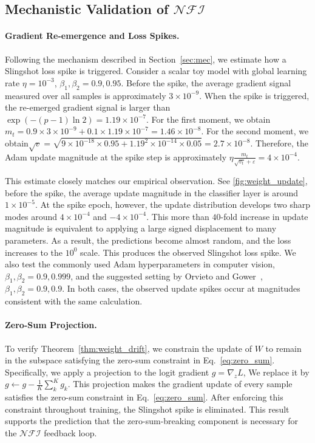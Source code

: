 \documentclass{article}
\theoremstyle{plain}
\theoremstyle{definition}
\theoremstyle{remark}
\begin{document}
\subsection{Mechanistic Validation of $\mathcal{NFI}$}



\paragraph{Gradient Re-emergence and Loss Spikes.}
Following the mechanism described in Section~\ref{sec:mec}, we estimate how a Slingshot loss spike is triggered. 
Consider a scalar toy model with global learning rate $\eta = 10^{-3}$, $\beta_1, \beta_2 = 0.9, 0.95$. 
Before the spike, the average gradient signal measured over all samples is approximately $3 \times 10^{-9}$. 
When the spike is triggered, the re-emerged gradient signal is larger than $\exp(-(p-1)\ln 2) = 1.19 \times 10^{-7}$. 
For the first moment, we obtain $m_t = 0.9 \times 3 \times 10^{-9} + 0.1 \times 1.19 \times 10^{-7} = 1.46 \times 10^{-8}$.
For the second moment, we obtain$\sqrt{v}=\sqrt{9\times 10^{-18}\times 0.95+1.19^2 \times 10^{-14}\times 0.05}=2.7\times 10^{-8}$. 
Therefore, the Adam update magnitude at the spike step is approximately $\eta\frac{m_t}{\sqrt{v_t}+\varepsilon}=4\times 10^{-4}$.

This estimate closely matches our empirical observation. 
See \cref{fig:weight_update}, before the spike, the average update magnitude in the classifier layer is around $1 \times 10^{-5}$. 
At the spike epoch, however, the update distribution develops two sharp modes around $4 \times 10^{-4}$ and $-4 \times 10^{-4}$. 
This more than $40$-fold increase in update magnitude is equivalent to 
applying a large signed displacement to many parameters. 
As a result, the predictions become almost random, and the loss increases to the $10^0$ scale. 
This produces the observed Slingshot loss spike. 
We also test the commonly used Adam hyperparameters in computer vision, $\beta_1, \beta_2 = 0.9, 0.999$, 
and the suggested setting by Orvieto and Gower~\cite{orvieto2026}, $\beta_1, \beta_2 = 0.9, 0.9$. 
In both cases, the observed update spikes occur at magnitudes consistent with the same calculation.
\paragraph{Zero-Sum Projection.}
To verify Theorem~\ref{thm:weight_drift}, we constrain the update of $W$ to remain in the subspace satisfying 
the zero-sum constraint in Eq.~\ref{eq:zero_sum}. Specifically, we apply a projection to the logit gradient $g=\nabla_z L$, 
We replace it by $g \gets g - \frac{1}{K}\sum^K_{k} g_k$. 
This projection makes the gradient update of every sample satisfies the zero-sum constraint in Eq.~\ref{eq:zero_sum}. 
After enforcing this constraint throughout training, the Slingshot spike is eliminated. 
This result supports the prediction that the zero-sum-breaking component is necessary for the $\mathcal{NFI}$ feedback loop.
\end{document}
